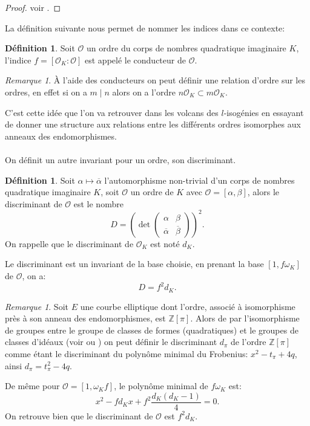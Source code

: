 \documentclass[10pt,a4paper]{book}
\theoremstyle{plain}
\theoremstyle{definition}
\theoremstyle{definition}
\theoremstyle{definition}
\theoremstyle{definition}
\theoremstyle{definition}
\newtheorem{defi}[thm]{Définition}
\theoremstyle{remark}
\newtheorem{rem}[thm]{Remarque}
\theoremstyle{remark}
\theoremstyle{definition}
\begin{document}
\begin{proof}
voir \cite[lemma 7.7.2]{Cox89}.
\end{proof}

La définition suivante nous permet de nommer les indices dans ce contexte:
\begin{defi}
Soit $\mathcal{O}$ un ordre du corps de nombres quadratique imaginaire $K$, 
l'indice $f=[\mathcal{O}_K : \mathcal{O}]$ est appelé le conducteur de 
$\mathcal{O}$.
\end{defi}

\begin{rem}
\`A l'aide des conducteurs on peut définir une relation d'ordre sur les ordres, en effet si on a $m \mid n$ alors on a l'ordre $n\mathcal{O}_K \subset m\mathcal{O}_K$.
\end{rem}

C'est cette idée que l'on va retrouver dans les volcans des $l$-isogénies en essayant de donner une structure aux relations entre les différents ordres isomorphes aux anneaux des endomorphismes.
\\
\\
On définit un autre invariant pour un ordre, son discriminant.

\begin{defi}
Soit $\alpha \mapsto \overline{\alpha}$ l'automorphisme non-trivial d'un corps 
de nombres quadratique imaginaire $K$, soit $\mathcal{O}$ un ordre de $K$ avec 
$\mathcal{O}=[\alpha, \beta]$, alors le discriminant de $\mathcal{O}$ est le 
nombre 
\[D= \left( \det \left( 
\begin{array}{cc}
\alpha & \beta\\
\overline{\alpha} & \overline{\beta}
\end{array} 
\right) \right)^2. \]
On rappelle que le discriminant de $\mathcal{O}_K$ est noté $d_K$.
\end{defi}
Le discriminant est un invariant de la base choisie, en prenant la base $[1, f 
\omega_K]$ de $\mathcal{O}$, on a:
\[D=f^2d_K.\]


\begin{rem}
\label{rem:def:dpi}
Soit $E$ une courbe elliptique dont l'ordre, associé à isomorphisme près à son 
anneau des endomorphismes, est $\mathbb{Z}[\pi]$. Alors de par l'isomorphisme 
de groupes entre le groupe de classes de formes (quadratiques) et le groupes de
classes d'idéaux (voir \cite[Theorem 7.7]{Cox89} ou \cite[Theorem 5.2.8]{Cohen96}) on 
peut définir le discriminant $d_{\pi}$ de l'ordre $\mathbb{Z}[\pi]$ comme étant
le discriminant du polynôme minimal du Frobenius: $x^2-t_{\pi}+4q$, ainsi 
$d_{\pi} =t_{\pi}^2-4q$.

De même pour $\mathcal{O}=[ 1, \omega_K f ]$, le polynôme 
minimal de $f \omega_K$ est:
\[
x^2-fd_Kx+f^2\frac{d_K (d_K-1)}{4}=0.
\]
On retrouve bien que le discriminant de $\mathcal{O}$ est $f^2d_K$.
\end{rem}
\end{document}
